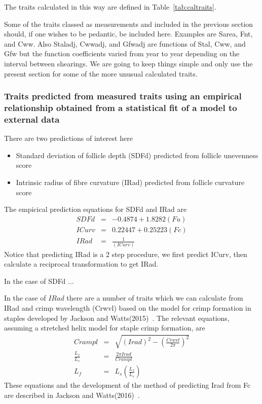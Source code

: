 \documentclass[titlepage]{article}  %
\begin{document}
The traits calculated in this way are defined in Table~\ref{tab:caltraits}.


 
Some of the traits classed as measurements and included in the previous section should, if one wishes to be pedantic, be included here. Examples are Sarea, Fnt, and Cww. Also Staladj, Cwwadj, and Gfwadj are functions of Stal, Cww, and Gfw but the function coefficients varied from year to year depending on the interval between shearings. We are going to keep things simple and only use the present section for some of the more unusual calculated traits.

\subsubsection{Traits predicted from measured traits using an empirical relationship obtained from a statistical fit of a model to external data}
There are two predictions of interest here
\begin{itemize}
\item Standard deviation of follicle depth (SDFd) predicted from follicle unevenness score
\item Intrinsic radius of fibre curvature (IRad) predicted from follicle curvature score
\end{itemize}
The empicical prediction equations for SDFd and IRad are
\begin{eqnarray}
SDFd & = &  -0.4874 + 1.8282(Fu) \\
ICurv & = & 0.22447 + 0.25223(Fc) \\ 
IRad & = &  \frac{1}{(ICurv)}
\end{eqnarray}
Notice that predicting IRad is a 2 step procedure, we first predict ICurv, then calculate a reciprocal transformation to get IRad.

In the case of SDFd ...

In the case of $IRad$ there are a number of traits which we can calculate from IRad and crimp wavelength (Crwvl) based on the model for crimp formation in staples developed by Jackson and Watts(2015)~\cite{jack:15}. The relevant equations, assuming a stretched helix model for staple crimp formation, are
\begin{eqnarray}
Crampl & = & \sqrt{(Irad)^{2} - \left(\frac{Crwvl}{2\pi}\right)^{2} } \\
\frac{L_{f}}{L_{s}} & = & \frac{2 \pi Irad}{Crampl} \\
L_{f} & = & L_{s} \left( \frac{L_{f}}{L_{s}} \right)
\end{eqnarray}
These equations and the development of the method of predicting Irad from Fc are described in Jackson and Watts(2016)~\cite{jack:16a}.
\end{document}
